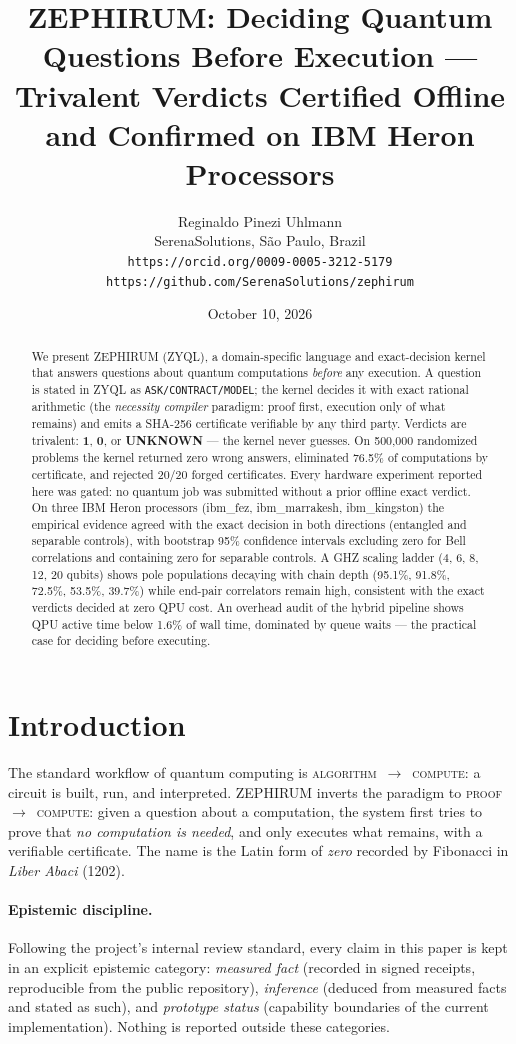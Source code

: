 \documentclass[11pt]{article}
\title{ZEPHIRUM: Deciding Quantum Questions Before Execution ---\\
Trivalent Verdicts Certified Offline and Confirmed on IBM Heron Processors}
\author{Reginaldo Pinezi Uhlmann\\
SerenaSolutions, S\~ao Paulo, Brazil\\
\texttt{https://orcid.org/0009-0005-3212-5179}\\
\texttt{https://github.com/SerenaSolutions/zephirum}}
\date{October 10, 2026}
\begin{document}
\maketitle

\begin{abstract}
We present ZEPHIRUM (ZYQL), a domain-specific language and exact-decision
kernel that answers questions about quantum computations \emph{before} any
execution. A question is stated in ZYQL as
\texttt{ASK/CONTRACT/MODEL}; the kernel decides it with exact rational
arithmetic (the \emph{necessity compiler} paradigm: proof first, execution
only of what remains) and emits a SHA-256 certificate verifiable by any
third party. Verdicts are trivalent: \textbf{1}, \textbf{0}, or
\textbf{UNKNOWN} --- the kernel never guesses. On 500{,}000 randomized
problems the kernel returned zero wrong answers, eliminated 76.5\% of
computations by certificate, and rejected 20/20 forged certificates.
Every hardware experiment reported here was gated: no quantum job was
submitted without a prior offline exact verdict. On three IBM Heron
processors (ibm\_fez, ibm\_marrakesh, ibm\_kingston) the empirical evidence
agreed with the exact decision in both directions (entangled and
separable controls), with bootstrap 95\% confidence intervals excluding
zero for Bell correlations and containing zero for separable controls. A
GHZ scaling ladder (4, 6, 8, 12, 20 qubits) shows pole populations decaying
with chain depth (95.1\%, 91.8\%, 72.5\%, 53.5\%, 39.7\%) while end-pair
correlators remain high, consistent with the exact verdicts decided at
zero QPU cost. An overhead audit of the hybrid pipeline shows QPU active
time below 1.6\% of wall time, dominated by queue waits --- the practical
case for deciding before executing.
\end{abstract}

\section{Introduction}
The standard workflow of quantum computing is
\textsc{algorithm}~$\rightarrow$~\textsc{compute}: a circuit is built, run,
and interpreted. ZEPHIRUM inverts the paradigm to
\textsc{proof}~$\rightarrow$~\textsc{compute}: given a question about a
computation, the system first tries to prove that \emph{no computation is
needed}, and only executes what remains, with a verifiable certificate.
The name is the Latin form of \emph{zero} recorded by Fibonacci in
\emph{Liber Abaci} (1202).

\paragraph{Epistemic discipline.}
Following the project's internal review standard, every claim in this paper is
kept in an explicit epistemic category: \emph{measured fact} (recorded in
signed receipts, reproducible from the public repository), \emph{inference}
(deduced from measured facts and stated as such), and \emph{prototype status}
(capability boundaries of the current implementation). Nothing is reported
outside these categories.
\end{document}
